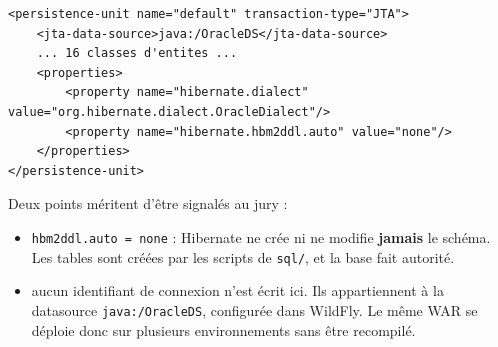 \begin{lstlisting}[style=xml]
<persistence-unit name="default" transaction-type="JTA">
    <jta-data-source>java:/OracleDS</jta-data-source>
    ... 16 classes d'entites ...
    <properties>
        <property name="hibernate.dialect" value="org.hibernate.dialect.OracleDialect"/>
        <property name="hibernate.hbm2ddl.auto" value="none"/>
    </properties>
</persistence-unit>
\end{lstlisting}

Deux points méritent d'être signalés au jury :

\begin{itemize}[leftmargin=*,itemsep=2pt]
  \item \texttt{hbm2ddl.auto = none} : Hibernate ne crée ni ne modifie
        \textbf{jamais} le schéma. Les tables sont créées par les scripts de
        \texttt{sql/}, et la base fait autorité.
  \item aucun identifiant de connexion n'est écrit ici. Ils appartiennent à la
        datasource \texttt{java:/OracleDS}, configurée dans WildFly. Le même
        WAR se déploie donc sur plusieurs environnements sans être recompilé.
\end{itemize}
